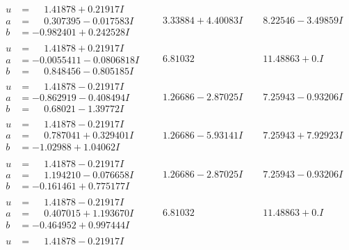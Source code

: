 \documentclass[1p]{elsarticle_modified}
\theoremstyle{definition}
\begin{document}
$$\begin{array}{c|c|c}
\begin{aligned}
u &= \phantom{-}1.41878 + 0.21917 I \\
a &= \phantom{-}0.307395 - 0.017583 I \\
b &= -0.982401 + 0.242528 I\end{aligned}
 & \phantom{-}3.33884 + 4.40083 I & \phantom{-}8.22546 - 3.49859 I \\ \hline\begin{aligned}
u &= \phantom{-}1.41878 + 0.21917 I \\
a &= -0.0055411 - 0.0806818 I \\
b &= \phantom{-}0.848456 - 0.805185 I\end{aligned}
 & \phantom{-}6.81032\phantom{ +0.000000I} & \phantom{-}11.48863 + 0. I\phantom{ +0.000000I} \\ \hline\begin{aligned}
u &= \phantom{-}1.41878 - 0.21917 I \\
a &= -0.862919 - 0.408494 I \\
b &= \phantom{-}0.68021 - 1.39772 I\end{aligned}
 & \phantom{-}1.26686 - 2.87025 I & \phantom{-}7.25943 - 0.93206 I \\ \hline\begin{aligned}
u &= \phantom{-}1.41878 - 0.21917 I \\
a &= \phantom{-}0.787041 + 0.329401 I \\
b &= -1.02988 + 1.04062 I\end{aligned}
 & \phantom{-}1.26686 - 5.93141 I & \phantom{-}7.25943 + 7.92923 I \\ \hline\begin{aligned}
u &= \phantom{-}1.41878 - 0.21917 I \\
a &= \phantom{-}1.194210 - 0.076658 I \\
b &= -0.161461 + 0.775177 I\end{aligned}
 & \phantom{-}1.26686 - 2.87025 I & \phantom{-}7.25943 - 0.93206 I \\ \hline\begin{aligned}
u &= \phantom{-}1.41878 - 0.21917 I \\
a &= \phantom{-}0.407015 + 1.193670 I \\
b &= -0.464952 + 0.997444 I\end{aligned}
 & \phantom{-}6.81032\phantom{ +0.000000I} & \phantom{-}11.48863 + 0. I\phantom{ +0.000000I} \\ \hline\begin{aligned}
u &= \phantom{-}1.41878 - 0.21917 I \\

\end{aligned}
\end{array}$$
\end{document}
